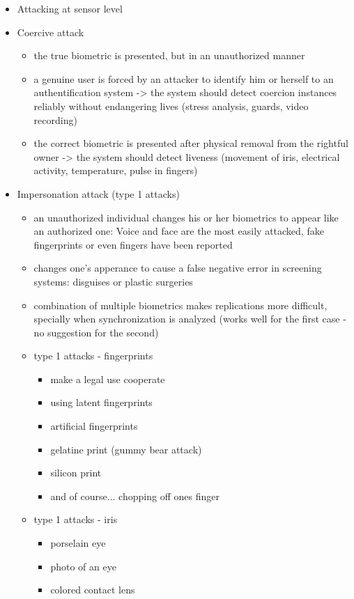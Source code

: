 \documentclass[paper=a4, fontsize=11pt]{scrartcl} %
\numberwithin{equation}{section} %
\numberwithin{figure}{section} %
\numberwithin{table}{section} %
\begin{document}
\begin{itemize}
\item Attacking at sensor level
\item Coercive attack
\begin{itemize}
\item the true biometric is presented, but in an unauthorized manner
\item a genuine user is forced by an attacker to identify him or herself to an authentification system -> the system should detect coercion instances reliably without endangering lives (stress analysis, guards, video recording)
\item the correct biometric is presented after physical removal from the rightful owner -> the system should detect liveness (movement of iris, electrical activity, temperature, pulse in fingers)
\end{itemize}
\item Impersonation attack (type 1 attacks)
\begin{itemize}
\item an unauthorized individual changes his or her biometrics to appear like an authorized one: Voice and face are the most easily attacked, fake fingerprints or even fingers have been reported
\item changes one's apperance to cause a false negative error in screening systems: disguises or plastic surgeries
\item combination of multiple biometrics makes replications more difficult, specially when synchronization is analyzed (works well for the first case - no suggestion for the second)
\item type 1 attacks - fingerprints
\begin{itemize}
\item make a legal use cooperate
\item using latent fingerprints
\item artificial fingerprints
\item gelatine print (gummy bear attack)
\item silicon print
\item and of course... chopping off ones finger
\end{itemize}
\item type 1 attacks - iris
\begin{itemize}
\item porselain eye
\item photo of an eye
\item colored contact lens

\end{itemize}
\end{itemize}
\end{itemize}
\end{document}
